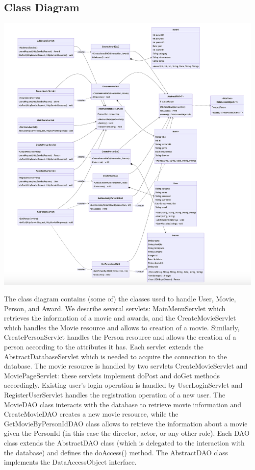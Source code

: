\subsection{Class Diagram}
\begin{center}
\includegraphics[angle=0, width=1.07\textwidth]{pictures/umlar.png}
\end{center}
\bigskip
The class diagram contains (some of) the classes used to handle User, Movie, Person, and Award. We describe several servlets: MainMenuServlet which retrieves the information of a movie and awards, and the CreateMovieServlet which handles the Movie resource and allows to creation of a movie. Similarly, CreatePersonServlet handles the Person resource and allows the creation of a person according to the attributes it has. Each servlet extends the AbstractDatabaseServlet which is needed to acquire the connection to the database. The movie resource is handled by two servlets CreateMovieServlet and MoviePageServlet: these servlets implement doPost and doGet methods accordingly.
Existing user's login operation is handled by UserLoginServlet and RegisterUserServlet handles the registration operation of a new user.
The MovieDAO class interacts with the database to retrieve movie information and CreateMovieDAO creates a new movie resource, while the GetMovieByPersonIdDAO class allows to retrieve the information about a movie given the PersonId (in this case the director, actor, or any other role).
Each DAO class extends the AbstractDAO class (which is delegated to the interaction with the database) and defines the doAccess() method. The AbstractDAO class implements the DataAccessObject interface. 

